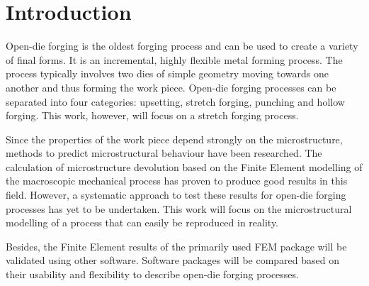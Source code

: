 \section{Introduction}

Open-die forging is the oldest forging process and can be used to create a variety of final forms. It is an incremental, highly flexible metal forming process. The process typically involves two dies of simple geometry moving towards one another and thus forming the work piece. Open-die forging processes can be separated into four categories: upsetting, stretch forging, punching and hollow forging. This work, however, will focus on a stretch forging process.\cite{hbut}

Since the properties of the work piece depend strongly on the microstructure, methods to predict microstructural behaviour have been researched. The calculation of microstructure devolution based on the Finite Element modelling of the macroscopic mechanical process has proven to produce good results in this field. However, a systematic approach to test these results for open-die forging processes has yet to be undertaken. This work will focus on the microstructural modelling of a process that can easily be reproduced in reality.

Besides, the Finite Element results of the primarily used FEM package will be validated using other software. Software packages will be compared based on their usability and flexibility to describe open-die forging processes.

